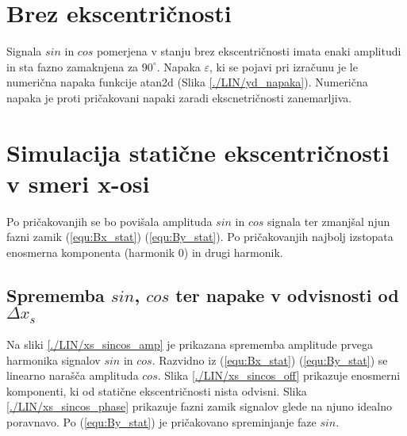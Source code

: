 \section{Brez ekscentričnosti}
Signala $sin$ in $cos$ pomerjena v stanju brez ekscentričnosti imata enaki amplitudi in sta fazno zamaknjena za $90^{\circ}$. Napaka $\varepsilon$, ki se pojavi pri izračunu je le numerična napaka funkcije atan2d (Slika \ref{./LIN/yd_napaka}). Numerična napaka je proti pričakovani napaki zaradi ekscnetričnosti zanemarljiva.
\section{Simulacija statične ekscentričnosti v smeri x-osi}
Po pričakovanjih se bo povišala amplituda $sin$ in $cos$ signala ter zmanjšal njun fazni zamik (\ref{equ:Bx_stat})  (\ref{equ:By_stat}). Po pričakovanjih najbolj izstopata enosmerna komponenta (harmonik 0) in drugi harmonik.
\subsection{Sprememba $sin$, $cos$ ter napake v odvisnosti od $\Delta x_s$}
Na sliki \ref{./LIN/xs_sincos_amp} je prikazana sprememba amplitude prvega harmonika signalov $sin$ in $cos$. Razvidno iz (\ref{equ:Bx_stat})  (\ref{equ:By_stat}) se linearno narašča amplituda $cos$. Slika \ref{./LIN/xs_sincos_off} prikazuje enosmerni komponenti, ki od statične ekscentričnosti nista odvisni. Slika \ref{./LIN/xs_sincos_phase} prikazuje fazni zamik signalov glede na njuno idealno poravnavo. Po (\ref{equ:By_stat}) je pričakovano spreminjanje faze $sin$.

